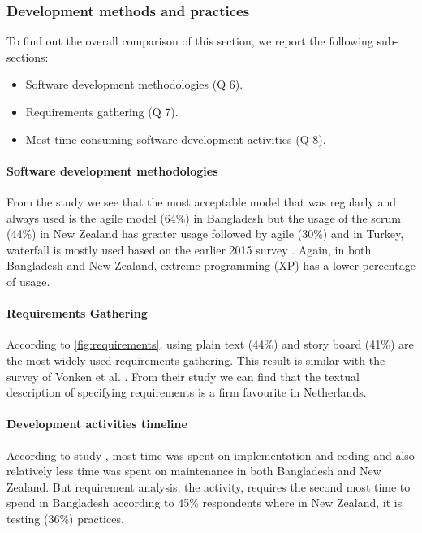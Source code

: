 \subsubsection{Development methods and practices}
\label{dev_methods}

To find out the overall comparison of this section, we report the following sub-sections:

\begin{itemize}
\item Software development methodologies (Q 6).
\item Requirements gathering (Q 7).
\item Most time consuming software development activities (Q 8).
\end{itemize}

\paragraph{Software development methodologies}
From the study we see that the most acceptable model that was regularly and always used is the agile model (64\%) in Bangladesh but the usage of the scrum (44\%) in New Zealand has greater usage followed by agile (30\%) \cite{Wang2018} and in Turkey, waterfall is mostly used based on the earlier 2015 survey \cite{Garousi2015}. Again, in both Bangladesh and New Zealand, extreme programming (XP) has a lower percentage of usage.

\paragraph{Requirements Gathering}
According to \ref{fig:requirements}, using plain text (44\%) and story board (41\%) are the most widely used requirements gathering. This result is similar with the survey of Vonken et al. \cite{Vonken2012}. From their study we can find that the textual description of specifying requirements is a firm favourite in Netherlands.

\paragraph{Development activities timeline}
According to study \cite{Wang2018}, most time was spent on implementation and coding and also relatively less time was spent on maintenance in both Bangladesh and New Zealand. But requirement analysis, the activity, requires the second most time to spend in Bangladesh according to 45\% respondents where in New Zealand, it is testing (36\%) practices.
